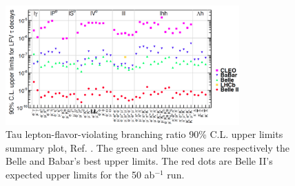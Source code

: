 \begin{figure}[!h]
\centering
\includegraphics[width =0.8\textwidth]{figures/png/Screenshot_20240319_134052.png}
\caption{Tau lepton-flavor-violating branching ratio 90\% C.L. upper limits summary plot, Ref. \cite{universe4100101}. The green and blue cones 
are respectively the Belle and Babar's best upper limits. The red dots are Belle II's expected upper limits for the 50 ab$^{-1}$ run.}
\label{fig:tauchannel}
\end{figure}

